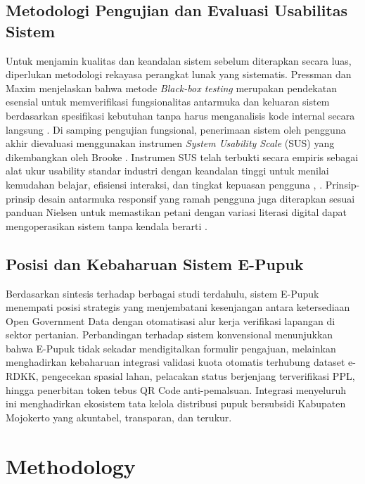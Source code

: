 ﻿\documentclass[conference]{IEEEtran}
\begin{document}
\subsection{Metodologi Pengujian dan Evaluasi Usabilitas Sistem}
Untuk menjamin kualitas dan keandalan sistem sebelum diterapkan secara luas, diperlukan metodologi rekayasa perangkat lunak yang sistematis. Pressman dan Maxim menjelaskan bahwa metode \textit{Black-box testing} merupakan pendekatan esensial untuk memverifikasi fungsionalitas antarmuka dan keluaran sistem berdasarkan spesifikasi kebutuhan tanpa harus menganalisis kode internal secara langsung \cite{b13}. Di samping pengujian fungsional, penerimaan sistem oleh pengguna akhir dievaluasi menggunakan instrumen \textit{System Usability Scale} (SUS) yang dikembangkan oleh Brooke \cite{b14}. Instrumen SUS telah terbukti secara empiris sebagai alat ukur usability standar industri dengan keandalan tinggi untuk menilai kemudahan belajar, efisiensi interaksi, dan tingkat kepuasan pengguna \cite{b14}, \cite{b16}. Prinsip-prinsip desain antarmuka responsif yang ramah pengguna juga diterapkan sesuai panduan Nielsen untuk memastikan petani dengan variasi literasi digital dapat mengoperasikan sistem tanpa kendala berarti \cite{b15}.

\subsection{Posisi dan Kebaharuan Sistem E-Pupuk}
Berdasarkan sintesis terhadap berbagai studi terdahulu, sistem E-Pupuk menempati posisi strategis yang menjembatani kesenjangan antara ketersediaan Open Government Data dengan otomatisasi alur kerja verifikasi lapangan di sektor pertanian. Perbandingan terhadap sistem konvensional menunjukkan bahwa E-Pupuk tidak sekadar mendigitalkan formulir pengajuan, melainkan menghadirkan kebaharuan integrasi validasi kuota otomatis terhubung dataset e-RDKK, pengecekan spasial lahan, pelacakan status berjenjang terverifikasi PPL, hingga penerbitan token tebus QR Code anti-pemalsuan. Integrasi menyeluruh ini menghadirkan ekosistem tata kelola distribusi pupuk bersubsidi Kabupaten Mojokerto yang akuntabel, transparan, dan terukur.


\section{Methodology}
\label{sec:methodology}
\end{document}
